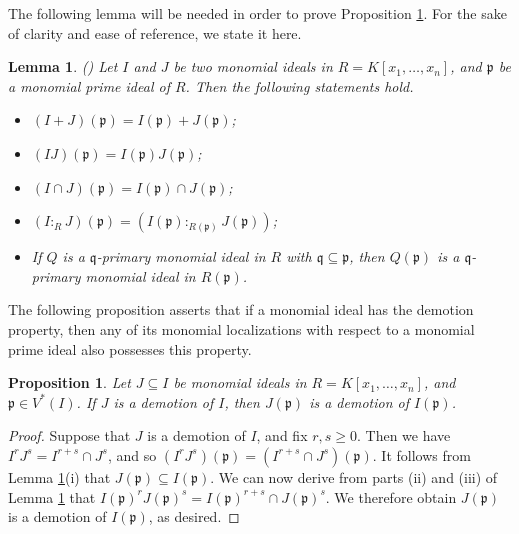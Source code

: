 \documentclass[11pt]{amsart}
\newtheorem{lemma}[theorem]{Lemma}
\newtheorem{proposition}[theorem]{Proposition}
\begin{document}
\bigskip
The following lemma will be needed in order to prove Proposition \ref{PRO.Localization}. For the sake of clarity and ease of reference, we state it here.
 
  \begin{lemma}\label{LEM.Localization} (\cite[Lemma 3.13]{SN})
Let $I$ and $J$ be two monomial ideals   in $R=K[x_1, \ldots, x_n]$, and $\mathfrak{p}$ be a monomial prime ideal of $R$. Then the following 
statements hold.
\begin {itemize}
\item[(i)]  $(I+J)(\mathfrak{p})= I(\mathfrak{p}) + J(\mathfrak{p})$;
\item[(ii)] $(IJ)(\mathfrak{p})= I(\mathfrak{p})  J(\mathfrak{p})$;
\item[(iii)] $(I\cap J)(\mathfrak{p})= I(\mathfrak{p}) \cap  J(\mathfrak{p})$;
\item[(iv)] $(I :_RJ)(\mathfrak{p})= (I(\mathfrak{p}) :_{R(\mathfrak{p})}  J(\mathfrak{p}))$;
\item[(v)]  If $Q$ is a $\mathfrak{q}$-primary monomial ideal in $R$ with $ \mathfrak{q}\subseteq \mathfrak{p}$, then $Q(\mathfrak{p})$ is a $\mathfrak{q}$-primary monomial ideal in $R(\mathfrak{p})$.
\end{itemize}
 \end{lemma}
 



 The following proposition  asserts that if a monomial ideal has the demotion property, then any of its monomial localizations with respect to a monomial prime ideal also possesses this property. 

 
\begin{proposition}\label{PRO.Localization}
Let  $J \subseteq I$ be monomial ideals in  $R=K[x_1, \ldots, x_n]$, and $\mathfrak{p}\in V^*(I)$. If  $J$ is a demotion of $I$, then  $J(\mathfrak{p})$ 
is a demotion of   $I(\mathfrak{p})$. 
\end{proposition}
\begin{proof}
Suppose that $J$ is a demotion of $I$,   and fix $r,s\geq 0$. Then we have $I^rJ^s=I^{r+s} \cap J^s$, and so 
  $(I^rJ^s)(\mathfrak{p})=(I^{r+s} \cap J^s)(\mathfrak{p})$. It follows from  Lemma \ref{LEM.Localization}(i) that  $J(\mathfrak{p}) \subseteq I(\mathfrak{p})$. 
   We can now derive from parts (ii) and (iii) of  Lemma \ref{LEM.Localization}  that 
 $I(\mathfrak{p})^rJ(\mathfrak{p})^s=I(\mathfrak{p})^{r+s} \cap J(\mathfrak{p})^s$. We therefore obtain  $J(\mathfrak{p})$ 
is a demotion of   $I(\mathfrak{p})$, as desired. 
 \end{proof}
\end{document}
